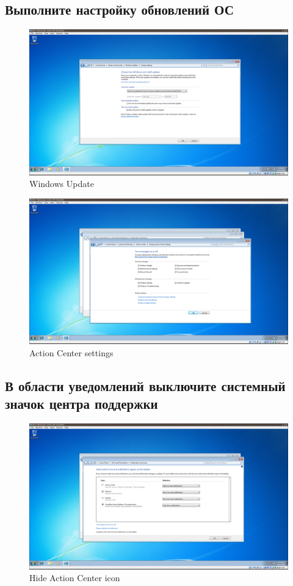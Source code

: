 \documentclass[a4paper]{article}
\begin{document}
\subsection{Выполните настройку обновлений ОС}
\begin{figure}[H]
    \centering
    \includegraphics[width=\linewidth]{48.png}
    \caption{Windows Update}
\end{figure}

\begin{figure}[H]
    \centering
    \includegraphics[width=\linewidth]{49.png}
    \caption{Action Center settings}
\end{figure}

\subsection{В области уведомлений выключите системный значок центра поддержки}
\begin{figure}[H]
    \centering
    \includegraphics[width=\linewidth]{50.png}
    \caption{Hide Action Center icon}
\end{figure}
\end{document}

